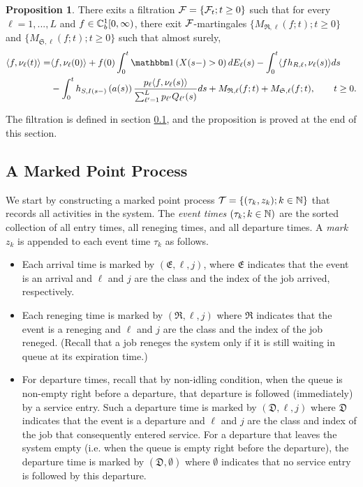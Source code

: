 \documentclass{article}
\theoremstyle{definition}
\newtheorem{proposition}[theorem]{Proposition}
\numberwithin{equation}{section}
\begin{document}
\begin{proposition}\label{prop_dynamic}
  There exits a filtration $\mathcal{F}=\{\mathcal{F}_t;t\geq0\}$ such that for every $\ell=1,...,L$ and $f\in\mathbb{C}_b^{1}[0,\infty)$, there exit  $\mathcal{F}$-martingales $\{M_{\mathfrak{R},\ell}(f;t);t\geq0\}$ and $\{M_{\mathfrak{S},\ell}(f;t);t\geq0\}$ such that almost surely,
  \begin{align}\label{dynamic_final}
    \langle f,\nu_\ell(t) \rangle = & \langle f,\nu_\ell(0)\rangle + f(0)\int_0^t \indic{X(s-)>0} d \arrival_\ell(s) - \int_0^t \langle fh_{R,\ell},\nu_\ell(s)\rangle ds \notag\\
    & - \int_0^t h_{S,\class(s-)}\left(\age(s)\right)\frac{\weight_\ell \langle f,\nu_\ell(s)\rangle }{\sum_{\ell'=1}^L\weight_{\ell'}\ql_{\ell'}(s)} ds + M_{\mathfrak{R},\ell}(f;t)+M_{\mathfrak{S},\ell}(f;t),\quad\quad t\geq0.
  \end{align}
\end{proposition}
The filtration is defined in section \ref{sec_MPP}, and the proposition is proved at the end of this section.

\subsection{A Marked Point Process}\label{sec_MPP}

We start by constructing a marked point process  ${\mathcal{T}}=\{(\tau_k,z_k);k\in\mathbb{N}\}$ that records all activities in the system. The \textit{event times} $(\tau_k;k\in\mathbb{N})$ are the sorted collection of all entry times, all reneging times, and all departure times. A \textit{mark} $z_k$ is appended to each event time $\tau_k$ as follows.
\begin{itemize}
\item Each arrival time is marked by $(\mathfrak{E}, \ell,j)$, where $\mathfrak{E}$ indicates that the event is an arrival and $\ell$ and $j$ are the class and the index of the job arrived, respectively.
\item Each reneging time is marked by $(\mathfrak{R},\ell,j)$ where $\mathfrak{R}$ indicates that the event is a reneging and $\ell$ and $j$ are the class and the index of the job reneged. (Recall that a job reneges the system only if it is still waiting in queue at its expiration time.)
\item For departure times, recall that by non-idling condition, when the queue is non-empty right before a departure, that departure is followed (immediately) by a service entry. Such  a departure time is marked by $(\mathfrak{D},\ell,j)$ where $\mathfrak{D}$ indicates that the event is a departure and $\ell$ and $j$ are the class and index of the job that consequently entered service. For a departure that leaves the system empty (i.e. when the queue is empty right before the departure), the departure time is marked by $(\mathfrak{D},\emptyset)$ where $\emptyset$ indicates that no service entry is followed by this departure.
\end{itemize}
\end{document}
